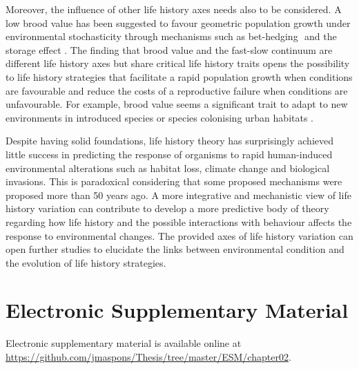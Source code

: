 Moreover, the influence of other life history axes needs also to be considered. 
A low brood value has been suggested to favour geometric population growth under 
environmental stochasticity through mechanisms such as bet-hedging 
\citep{Stearns2000a}⁠ and the storage effect \citep{Cubaynes2011}. The finding
that brood value and the fast-slow continuum are different life history axes but
share critical life history traits opens the possibility to life history
strategies that facilitate a rapid population growth when conditions are
favourable and reduce the costs of a reproductive failure when conditions are
unfavourable. For example, brood value seems a significant trait to adapt to
new environments in introduced species or species colonising urban habitats
\citep{Sol2012a,Sol2014}.

Despite having solid foundations, life history theory has surprisingly achieved 
little success in predicting the response of organisms to rapid human-induced 
environmental alterations such as habitat loss, climate change and biological 
invasions. This is paradoxical considering that some proposed mechanisms were 
proposed more than 50 years ago. A more integrative and mechanistic view of life 
history variation can contribute to develop a more predictive body of theory 
regarding how life history and the possible interactions with behaviour
\citep{Ricklefs2002,Reale2010a,Sol2018,Maspons2019} affects the response to
environmental changes. The provided axes of life history variation can open
further studies to elucidate the links between environmental condition and the
evolution of life history strategies.


\section*{Electronic Supplementary Material}

Electronic supplementary material is available online at
\url{https://github.com/jmaspons/Thesis/tree/master/ESM/chapter02}.
